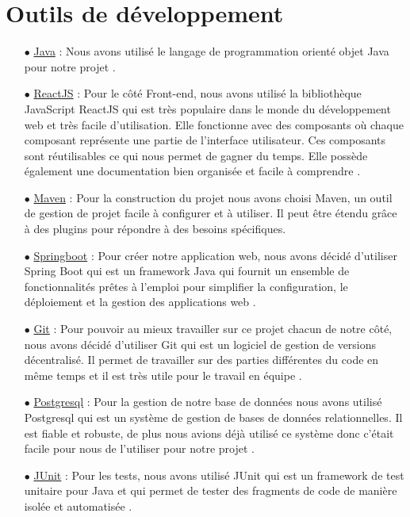 \documentclass[a4paper]{report}
\begin{document}
\section{Outils de développement}

\begin{itemize}
    \item[$\bullet$] \underline{Java} : Nous avons utilisé le langage de programmation orienté objet Java pour notre projet \cite{JavaSE17API}. \newline
    \item[$\bullet$] \underline{ReactJS} : Pour le côté Front-end, nous avons utilisé la bibliothèque JavaScript ReactJS qui est très populaire dans le monde du développement web et 
    très facile d'utilisation. Elle fonctionne avec des composants où chaque composant représente une partie de l'interface utilisateur. Ces composants sont réutilisables ce qui nous permet de gagner du temps. 
    Elle possède également une documentation bien organisée et facile à comprendre \cite{ReactJS}. \newline
    \item[$\bullet$] \underline{Maven} : Pour la construction du projet nous avons choisi Maven, un outil de gestion de projet facile à configurer et à utiliser. Il peut être étendu grâce à des plugins pour répondre à des besoins spécifiques. \cite{ApacheMaven}\newline
    \item[$\bullet$] \underline{Springboot} : Pour créer notre application web, nous avons décidé d'utiliser Spring Boot qui est un framework Java qui fournit un ensemble de fonctionnalités prêtes à l'emploi pour simplifier la configuration, 
    le déploiement et la gestion des applications web \cite{springboot}. \newline 
    \item[$\bullet$] \underline{Git} : Pour pouvoir au mieux travailler sur ce projet chacun de notre côté, nous avons décidé d'utiliser Git qui est un logiciel de gestion de versions décentralisé. Il permet de travailler
    sur des parties différentes du code en même temps et il est très utile pour le travail en équipe \cite{GitDocumentation}.\newline
    \item[$\bullet$] \underline{Postgresql} : Pour la gestion de notre base de données nous avons utilisé Postgresql qui est un système de gestion de bases de données relationnelles. Il est fiable et robuste, de plus 
    nous avions déjà utilisé ce système donc c'était facile pour nous de l'utiliser pour notre projet \cite{postgresql_doc}. \newline
    \item[$\bullet$] \underline{JUnit} : Pour les tests, nous avons utilisé JUnit qui est un framework de test unitaire pour Java et qui permet de tester des fragments de code de manière isolée et automatisée \cite{JUnit5}.\newline
\end{itemize}
\end{document}
